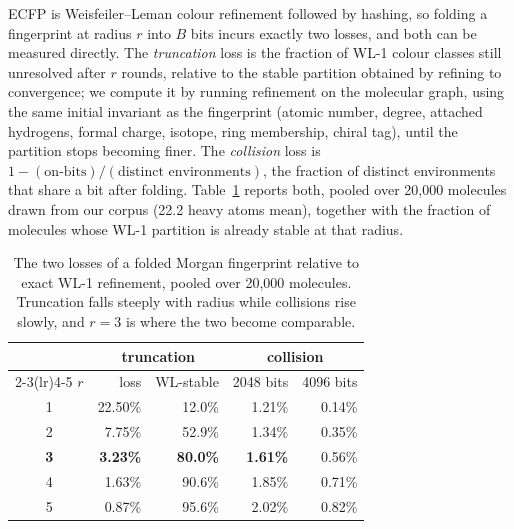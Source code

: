 ECFP is Weisfeiler--Leman colour refinement followed by hashing, so folding a fingerprint at
radius $r$ into $B$ bits incurs exactly two losses, and both can be measured directly. The
\emph{truncation} loss is the fraction of WL-1 colour classes still unresolved after $r$ rounds,
relative to the stable partition obtained by refining to convergence; we compute it by running
refinement on the molecular graph, using the same initial invariant as the fingerprint
(atomic number, degree, attached hydrogens, formal charge, isotope, ring membership, chiral tag),
until the partition stops becoming finer. The \emph{collision} loss is
$1 - (\text{on-bits})/(\text{distinct environments})$, the fraction of distinct environments that
share a bit after folding. Table~\ref{tab:radius} reports both, pooled over 20{,}000 molecules
drawn from our corpus (22.2 heavy atoms mean), together with the fraction of molecules whose
WL-1 partition is already stable at that radius.

\begin{table}[h]
\centering
\begin{tabular}{crrrr}
\toprule
& \multicolumn{2}{c}{truncation} & \multicolumn{2}{c}{collision} \\
\cmidrule(lr){2-3}\cmidrule(lr){4-5}
$r$ & loss & WL-stable & 2048 bits & 4096 bits \\
\midrule
1 & 22.50\% & 12.0\% & 1.21\% & 0.14\% \\
2 &  7.75\% & 52.9\% & 1.34\% & 0.35\% \\
\textbf{3} & \textbf{3.23\%} & \textbf{80.0\%} & \textbf{1.61\%} & 0.56\% \\
4 &  1.63\% & 90.6\% & 1.85\% & 0.71\% \\
5 &  0.87\% & 95.6\% & 2.02\% & 0.82\% \\
\bottomrule
\end{tabular}
\caption{The two losses of a folded Morgan fingerprint relative to exact WL-1 refinement, pooled
over 20{,}000 molecules. Truncation falls steeply with radius while collisions rise slowly, and
$r = 3$ is where the two become comparable.}
\label{tab:radius}
\end{table}

